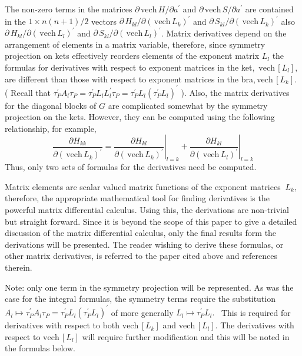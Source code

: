 \documentclass[12pt]{article}
\begin{document}
The non-zero terms in the matrices $\partial\,\mathrm{vech}\,H/\partial
a^{\prime}$ and $\partial\,\mathrm{vech}\,S/\partial a^{\prime}$ are contained
in the $1\times n\left(  n+1\right)  /2$ vectors $\partial\,H_{kl}%
/\partial\left(  \,\mathrm{vech}\,L_{k}\right)  ^{\prime}$ and $\partial
\,S_{kl}/\partial\left(  \,\mathrm{vech}\,L_{k}\right)  ^{\prime}$ also
$\partial\,H_{kl}/\partial\left(  \,\mathrm{vech}\,L_{l}\right)  ^{\prime}$
and $\partial\,S_{kl}/\partial\left(  \,\mathrm{vech}\,L_{l}\right)  ^{\prime
}$. Matrix derivatives depend on the arrangement of elements in a matrix
variable, therefore, since symmetry projection on kets effectively reorders
elements of the exponent matrix $L_{l}$ the formulas for derivatives with
respect to exponent matrices in the ket, $\,\mathrm{vech}\,\left[
L_{l}\right]  ,$ are different than those with respect to exponent matrices in
the bra,$\,\mathrm{vech}\,\left[  L_{k}\right]  $. ( Recall that $\tau
_{P}^{\prime}A_{l}\tau_{P}=\tau_{P}^{\prime}L_{l}L_{l}^{\prime}\tau_{P}%
=\tau_{P}^{\prime}L_{l}\left(  \tau_{P}^{\prime}L_{l}\right)  ^{\prime}$ ).
Also, the matrix derivatives for the diagonal blocks of $G$ are complicated
somewhat by the symmetry projection on the kets. However, they can be computed
using the following relationship, for example,
\begin{equation}
\frac{\partial H_{kk}}{\partial\left(  \,\mathrm{vech}\,L_{k}\right)
^{\prime}}=\left.  \frac{\partial H_{kl}}{\partial\left(  \,\mathrm{vech}%
\,L_{k}\right)  ^{\prime}}\right|  _{l=k}+\left.  \frac{\partial H_{kl}%
}{\partial\left(  \,\mathrm{vech}\,L_{l}\right)  ^{\prime}}\right|  _{l=k}%
\end{equation}
Thus, only two sets of formulas for the derivatives need be computed.

Matrix elements are scalar valued matrix functions of the exponent matrices
$\ L_{k},$ therefore, the appropriate mathematical tool for finding
derivatives is the powerful matrix differential calculus\cite{Kinghorn95a}.
Using this, the derivations are non-trivial but straight forward. Since it is
beyond the scope of this paper to give a detailed discussion of the matrix
differential calculus, only the final results form the derivations will be
presented. The reader wishing to derive these formulas, or other matrix
derivatives, is referred to the paper cited above and references therein.

Note: only one term in the symmetry projection will be represented. As was the
case for the integral formulas, the symmetry terms require the substitution
$A_{l}\mapsto\tau_{P}^{\prime}A_{l}\tau_{P}=\tau_{P}^{\prime}L_{l}\left(
\tau_{P}^{\prime}L_{l}\right)  ^{\prime}$ of more generally $L_{l}\mapsto
\tau_{P}^{\prime}L_{l}.$ \ This is required for derivatives with respect to
both $\mathrm{vech}\,\left[  L_{k}\right]  $ and $\mathrm{vech}\,\left[
L_{l}\right]  .$ The derivatives with respect to $\mathrm{vech}\,\left[
L_{l}\right]  $ will require further modification and this will be noted in
the formulas below.
\end{document}
